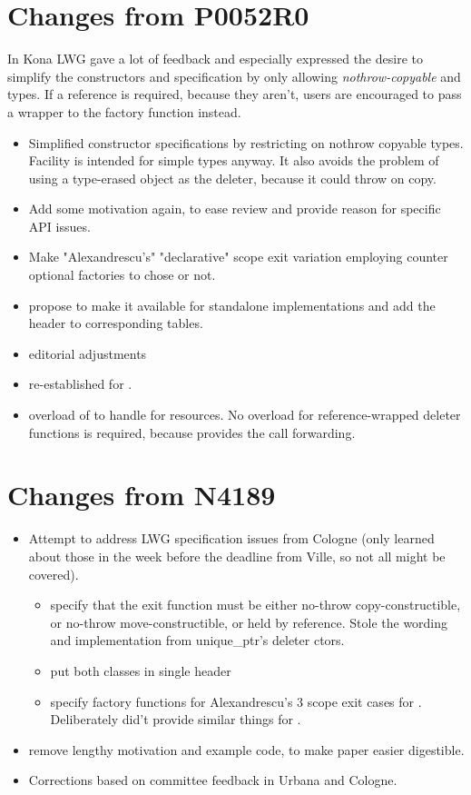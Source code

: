 \documentclass[ebook,11pt,article]{memoir}
\begin{document}
\section{Changes from P0052R0}
In Kona LWG gave a lot of feedback and especially expressed the desire to simplify the constructors and specification by only allowing \emph{nothrow-copyable}  and  types. If a reference is required, because they aren't, users are encouraged to pass a  wrapper to the factory function instead.
\begin{itemize}
\item Simplified constructor specifications by restricting on nothrow copyable types. Facility is intended for simple types anyway. It also avoids the problem of using a type-erased  object as the deleter, because it could throw on copy.
\item Add some motivation again, to ease review and provide reason for specific API issues.
\item Make "Alexandrescu's" "declarative" scope exit variation employing  counter optional factories to chose or not.
\item propose to make it available for standalone implementations and add the header  to corresponding tables.
\item editorial adjustments
\item re-established  for .
\item overload of  to handle  for resources. No overload for reference-wrapped deleter functions is required, because  provides the call forwarding.
\end{itemize}
\section{Changes from N4189}
\begin{itemize}
\item Attempt to address LWG specification issues from Cologne (only learned about those in the week before the deadline from Ville, so not all might be covered).
\begin{itemize}
\item specify that the exit function must be either no-throw copy-constructible, or no-throw move-constructible, or held by reference. Stole the wording and implementation from unique_ptr's deleter ctors.
\item put both classes in single header 
\item specify factory functions for Alexandrescu's 3 scope exit cases for . Deliberately did't provide similar things for .
\end{itemize}
\item remove lengthy motivation and example code, to make paper easier digestible.
\item Corrections based on committee feedback in Urbana and Cologne.
\end{itemize}
\end{document}
